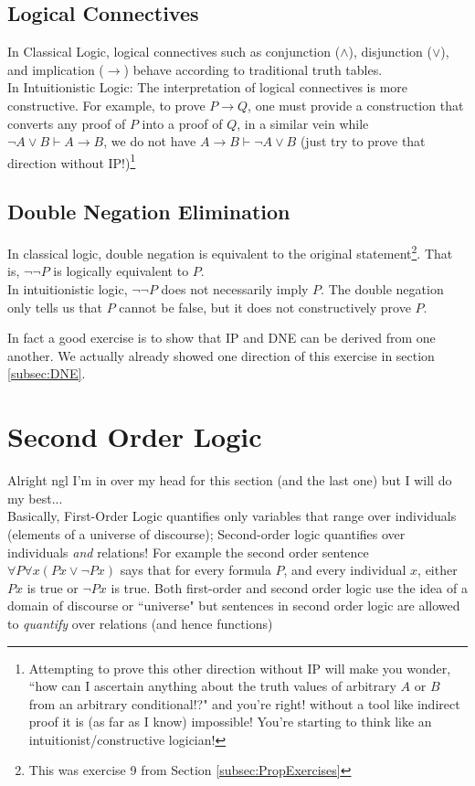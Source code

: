\subsection{Logical Connectives}
In Classical Logic, logical connectives such as conjunction ($\wedge$), disjunction ($\lor$), and implication ($\rightarrow$) behave according to traditional truth tables. \\

\noindent In Intuitionistic Logic: The interpretation of logical connectives is more constructive. For example, to prove $P\rightarrow Q$, one must provide a construction that converts any proof of $P$ into a proof of $Q$, in a similar vein while $\neg A \lor B \vdash A\rightarrow B$, we do not have $A\rightarrow B \vdash \neg A \lor B$ (just try to prove that direction without IP!)\footnote{Attempting to prove this other direction without IP will make you wonder, ``how can I ascertain anything about the truth values of arbitrary $A$ or $B$ from an arbitrary conditional!?" and you're right! without a tool like indirect proof it is (as far as I know) impossible! You're starting to think like an intuitionist/constructive logician!}

\subsection{Double Negation Elimination}
In classical logic, double negation is equivalent to the original statement\footnote{This was exercise 9 from Section \ref{subsec:PropExercises}}. That is, $\neg \neg P$ is logically equivalent to $P$. \\

\noindent In intuitionistic logic, $\neg \neg P$ does not necessarily imply $P$. The double negation only tells us that 
$P$ cannot be false, but it does not constructively prove $P$.

In fact a good exercise is to show that IP and DNE can be derived from one another. We actually already showed one direction of this exercise in section \ref{subsec:DNE}.

\section{Second Order Logic}
Alright ngl I'm in over my head for this section (and the last one) but I will do my best... \\

Basically, First-Order Logic quantifies only variables that range over individuals (elements of a universe of discourse); Second-order logic quantifies over individuals \textit{and} relations! For example the second order sentence $\forall P \forall x (Px\lor \neg Px)$ says that for every formula $P$, and every individual $x$, either $Px$ is true or $\neg Px$ is true. Both first-order and second order logic use the idea of a domain of discourse or ``universe" but sentences in second order logic are allowed to \textit{quantify} over relations (and hence functions)

